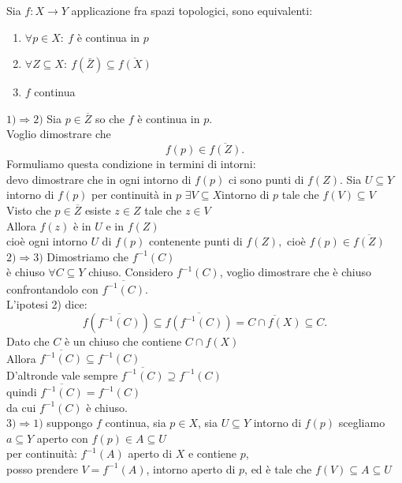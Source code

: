 \documentclass{article}
\begin{document}
	\begin{teo}
		Sia $f:X \rightarrow Y$ applicazione fra spazi topologici, sono equivalenti:
\begin{enumerate}
	\item $\forall p\in X:\  f$  è continua in $p$
	\item  $\forall Z\subseteq X: \ f(\bar Z)\subseteq \overline {f(X)}$  
	\item $f$ continua
\end{enumerate}
	\end{teo}
	\begin{dimo}
		$1) \Rightarrow 2)$ Sia $p\in \overline Z$ so che  $f$ è continua in $p$.\\
		Voglio dimostrare che 
		 \[
		 f(p)\in \overline{f(Z)}
		.\] 
		Formuliamo questa condizione in termini di intorni:\\
		devo dimostrare che in ogni intorno di $f(p)$ ci sono punti di  $f(Z)$. Sia $U\subseteq Y$ intorno di  $f(p)$ per continuità in $p$ $\exists V\subseteq X$intorno di  $p$ tale che $f(V)\subseteq V$ \\
		Visto che $p\in \overline Z$ esiste  $z\in Z$ tale che $z\in V$\\
		Allora  $f(z)$ è in $U$ e in $f(Z)$\\
		cioè ogni intorno $U$ di $f(p)$ contenente punti di $f(Z),$ cioè $f(p)\in \overline{f(Z)}$\\[10px]
		$2) \Rightarrow 3)$ Dimostriamo che $f^{-1}(C)$\\
		è chiuso  $\forall C\subseteq Y$ chiuso. Considero $f^{-1} (C)$, voglio dimostrare che è chiuso confrontandolo con  $\overline{f^{-1}(C)}$.\\
		L'ipotesi 2) dice:
		 \[
			 f(\overline{f^{-1}(C)})\subseteq\overline{f(f^{-1}(C))} = \overline{C\cap f(X)}\subseteq C
		.\] 
		Dato che $C$ è un chiuso che contiene $C\cap f(X)$\\
		Allora  $\overline{f^{-1}(C)}\subseteq f^{-1}(C)$\\
		D'altronde vale sempre  $\overline{f^{-1}(C)} \supseteq f^{-1}(C)$\\
		quindi  $\overline{f^{-1}(C)}= f^{-1}(C)$\\
		da cui  $f^{-1}(C)$ è chiuso.\\[10px]
		$3) \Rightarrow 1)$ suppongo $f$ continua, sia $p\in X$, sia $U\subseteq Y$ intorno di $f(p)$ scegliamo $a\subseteq Y$ aperto con $f(p)\in A \subseteq U$\\
		per continuità:
		$f^{-1}(A)$ aperto di $X$ e contiene  $p$,\\
		posso prendere  $V = f^{-1}(A)$, intorno aperto di $p$, ed è tale che  $f(V)\subseteq A\subseteq U$\\
	\end{dimo}
\end{document}
